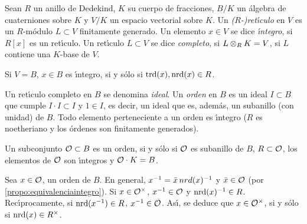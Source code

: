 Sean $R$ un anillo de Dedekind, $K$ su cuerpo de fracciones, $B/K$ un
\'{a}lgebra de cuaterniones sobre $K$ y $V/K$ un espacio vectorial sobre $K$.
Un \emph{($R$-)ret\'{\i}culo} en $V$ es un
$R$-m\'{o}dulo $L\subset V$ finitamente generado. Un elemento $x\in V$ se dice
\emph{\'{\i}ntegro}, si $R[x]$ es un ret\'{\i}culo.
Un ret\'{\i}culo $L\subset V$ se dice \emph{completo}, si
$L\tensor[R]K=V$, si $L$ contiene una $K$-base de $V$.

\begin{propoEquivalenciaIntegro}\label{propo:equivalenciaintegro}
	Si $V=B$, $x\in B$ es \'{\i}ntegro, si y s\'{o}lo si
	$\trd(x),\nrd(x)\in R$.
\end{propoEquivalenciaIntegro}

Un ret\'{\i}culo completo en $B$ se denomina \emph{ideal}. Un
\emph{orden} en $B$ es un ideal $I\subset B$ que cumple
$I\cdot I\subset I$ y $1\in I$, es decir, un ideal que es, adem\'{a}s, un
subanillo (con unidad) de $B$. Todo elemento perteneciente a un orden es
\'{\i}ntegro ($R$ es noetheriano y los \'{o}rdenes son finitamente
generados).

\begin{propoEquivalenciaOrden}\label{propo:equivalenciaorden}
	Un subconjunto $\cal{O}\subset B$ es un orden, si y s\'{o}lo si
	$\cal{O}$ es subanillo de $B$, $R\subset\cal{O}$, los elementos de
	$\cal{O}$ son \'{\i}ntegros y $\cal{O}\cdot K=B$.
\end{propoEquivalenciaOrden}

\begin{obsUnidadesDeUnOrden}\label{obs:unidadesdeunorden}
	Sea $x\in\cal{O}$, un orden de $B$. En general,
	$x^{-1}=\conj{x}\,nrd(x)^{-1}$ y $\conj{x}\in\cal{O}$ (por
	\ref{propo:equivalenciaintegro}). Si $x\in\cal{O}^{\times}$,
	$x^{-1}\in\cal{O}$ y $\nrd(x)^{-1}\in R$. Rec\'{\i}procamente, si
	$\nrd(x^{-1})\in R$, $x^{-1}\in\cal{O}$. As\'{\i}, se deduce que
	$x\in\cal{O}^{\times}$, si y s\'{o}lo si $\nrd(x)\in R^{\times}$.
\end{obsUnidadesDeUnOrden}

